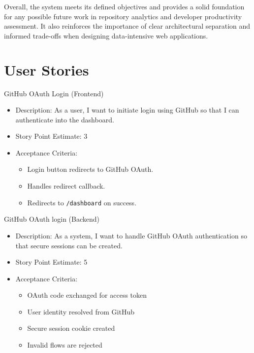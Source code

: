 \documentclass[12pt,reqno, twoside]{amsbook}
\makeatletter
\def\section{\@startsection{section}{1}%
      \z@{.5\linespacing\@plus.7\linespacing}{.25\linespacing}%
      {\normalfont\bfseries\flushleft}}
\theoremstyle{plain}
\numberwithin{equation}{chapter}
\numberwithin{section}{chapter}
\makeatother
\begin{document}
Overall, the system meets its defined objectives and provides a solid foundation for any possible future work 
in repository analytics and developer productivity assessment. It also reinforces the importance of clear 
architectural separation and informed trade-offs when designing data-intensive web applications.

\appendix

\chapter{User Stories}
\section{GitHub OAuth Login (Frontend)}
\begin{itemize}
  \item Description: As a user, I want to initiate login using GitHub so that I can authenticate into the dashboard.
  \item Story Point Estimate: 3 
  \item Acceptance Criteria: 
    \begin{itemize}
      \item Login button redirects to GitHub OAuth.
      \item Handles redirect callback.
      \item Redirects to \texttt{/dashboard} on success.
    \end{itemize}
\end{itemize}

\section{GitHub OAuth login (Backend)}
\begin{itemize}
  \item Description: As a system, I want to handle GitHub OAuth authentication so that secure sessions can be created.
  \item Story Point Estimate: 5
  \item Acceptance Criteria: 
    \begin{itemize}
      \item OAuth code exchanged for access token
      \item User identity resolved from GitHub
      \item Secure session cookie created
      \item Invalid flows are rejected
    \end{itemize}
\end{itemize}
\end{document}
